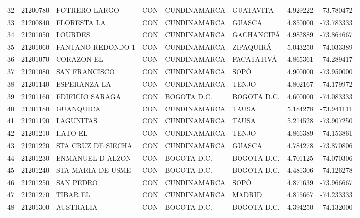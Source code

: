 \documentclass[11pt]{article}
\begin{document}
\begin{table}
\begin{tabular}{lrllllrr}
32  &  21200780 &             POTRERO LARGO &  CON &  CUNDINAMARCA &         GUATAVITA &  4.929222 & -73.780472 \\
33  &  21200840 &              FLORESTA LA  &  CON &  CUNDINAMARCA &            GUASCA &  4.850000 & -73.783333 \\
34  &  21201050 &                  LOURDES  &  CON &  CUNDINAMARCA &        GACHANCIPÁ &  4.982889 & -73.864667 \\
35  &  21201060 &         PANTANO REDONDO 1 &  CON &  CUNDINAMARCA &         ZIPAQUIRÁ &  5.043250 & -74.033389 \\
36  &  21201070 &               CORAZON EL  &  CON &  CUNDINAMARCA &        FACATATIVÁ &  4.865361 & -74.289417 \\
37  &  21201080 &             SAN FRANCISCO &  CON &  CUNDINAMARCA &              SOPÓ &  4.900000 & -73.950000 \\
38  &  21201140 &             ESPERANZA LA  &  CON &  CUNDINAMARCA &             TENJO &  4.802167 & -74.179972 \\
39  &  21201160 &           EDIFICIO SARAGA &  CON &   BOGOTA D.C. &       BOGOTA D.C. &  4.600000 & -74.083333 \\
40  &  21201180 &                GUANQUICA  &  CON &  CUNDINAMARCA &             TAUSA &  5.184278 & -73.941111 \\
41  &  21201190 &                LAGUNITAS  &  CON &  CUNDINAMARCA &             TAUSA &  5.214528 & -73.907250 \\
42  &  21201210 &                HATO EL    &  CON &  CUNDINAMARCA &             TENJO &  4.866389 & -74.153861 \\
43  &  21201220 &        STA CRUZ DE SIECHA &  CON &  CUNDINAMARCA &            GUASCA &  4.784278 & -73.870806 \\
44  &  21201230 &          ENMANUEL D ALZON &  CON &   BOGOTA D.C. &       BOGOTA D.C. &  4.701125 & -74.070306 \\
45  &  21201240 &         STA MARIA DE USME &  CON &   BOGOTA D.C. &       BOGOTA D.C. &  4.481306 & -74.126278 \\
46  &  21201250 &                SAN PEDRO  &  CON &  CUNDINAMARCA &              SOPÓ &  4.871639 & -73.966667 \\
47  &  21201270 &                 TIBAR EL  &  CON &  CUNDINAMARCA &            MADRID &  4.816667 & -74.233333 \\
48  &  21201300 &                AUSTRALIA  &  CON &   BOGOTA D.C. &       BOGOTA D.C. &  4.394250 & -74.132000 \\

\end{tabular}
\end{table}
\end{document}
